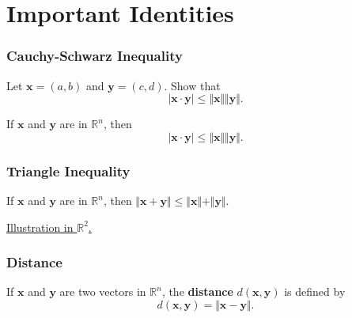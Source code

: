 \documentclass[20pt,a4paper]{extarticle}
\newcounter{example}
\newcounter{theorem}
\newcounter{definition}
\begin{document}
\newpage 

\section{Important Identities}

	\subsubsection{Cauchy-Schwarz Inequality}
	\begin{example}
	Let $\mathbf{x} = (a, b)$ and $\mathbf{y} = (c, d)$. Show that
		\[
			|\mathbf{x} \cdot \mathbf{y}| \leq \Vert \mathbf{x} \Vert \Vert \mathbf{y} \Vert .
		\]
	\end{example}

	\begin{solution}

	\end{solution}

	\vfill

	\begin{theorem}
	If $\mathbf{x}$ and $\mathbf{y}$ are in $\mathbb{R}^n$, then
		\[
			| \mathbf{x} \cdot \mathbf{y} | \leq \Vert \mathbf{x} \Vert \Vert \mathbf{y} \Vert .
		\]
	\end{theorem}

	\newpage 

	\subsubsection{Triangle Inequality}

	\begin{theorem}
	If $\mathbf{x}$ and $\mathbf{y}$ are in $\mathbb{R}^n$, then $\Vert \mathbf{x} + \mathbf{y} \Vert \leq \Vert \mathbf{x} \Vert + \Vert \mathbf{y} \Vert$.
	\end{theorem}

	\underline{Illustration in $\mathbb{R}^2$.}

	\vspace*{6cm}

	\subsubsection{Distance}

	\begin{definition}
	If $\mathbf{x}$ and $\mathbf{y}$ are two vectors in $\mathbb{R}^n$, the \textbf{distance} $d (\mathbf{x}, \mathbf{y})$ is defined by
		\[
			d (\mathbf{x} , \mathbf{y} ) = \Vert \mathbf{x} - \mathbf{y} \Vert .
		\]
	\end{definition}
\end{document}
